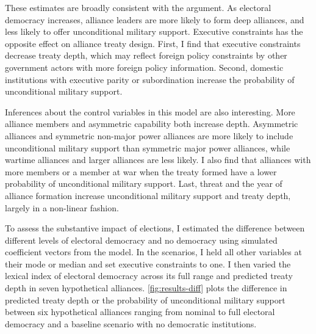 \documentclass[12pt]{article}
\begin{document}
These estimates are broadly consistent with the argument. 
As electoral democracy increases, alliance leaders are more likely to form deep alliances, and less likely to offer unconditional military support. 
Executive constraints has the opposite effect on alliance treaty design.
First, I find that executive constraints decrease treaty depth, which may reflect foreign policy constraints by other government actors with more foreign policy information.
Second, domestic institutions with executive parity or subordination increase the probability of unconditional military support. 


Inferences about the control variables in this model are also interesting.
More alliance members and asymmetric capability both increase depth. 
Asymmetric alliances and symmetric non-major power alliances are more likely to include unconditional military support than symmetric major power alliances, while wartime alliances and larger alliances are less likely. 
I also find that alliances with more members or a member at war when the treaty formed have a lower probability of unconditional military support. 
Last, threat and the year of alliance formation increase unconditional military support and treaty depth, largely in a non-linear fashion.


To assess the substantive impact of elections, I estimated the difference between different levels of electoral democracy and no democracy using simulated coefficient vectors from the model. 
In the scenarios, I held all other variables at their mode or median and set executive constraints to one. 
I then varied the lexical index of electoral democracy across its full range and predicted treaty depth in seven hypothetical alliances. 
\autoref{fig:results-diff} plots the difference in predicted treaty depth or the probability of unconditional military support between six hypothetical alliances ranging from nominal to full electoral democracy and a baseline scenario with no democratic institutions. 
\end{document}
